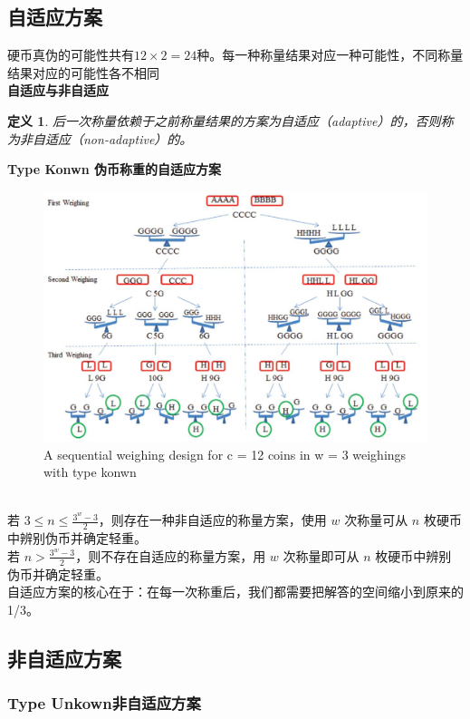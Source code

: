 \documentclass[10t, a4paper, oneside]{ctexbook}
\newtheorem{definition}[theorem]{定义}
\begin{document}
\subsection{自适应方案}
硬币真伪的可能性共有$12\times2 = 24$种。每一种称量结果对应一种可能性，不同称量结果对应的可能性各不相同\\
\textbf{自适应与非自适应}
\begin{definition}
后一次称量依赖于之前称量结果的方案为自适应（adaptive）的，否则称为非自适应（non-adaptive）的。\\
\end{definition}
\textbf{Type Konwn 伪币称重的自适应方案}
\begin{figure}[H]
    \centering
    \includegraphics[width = 15cm]{assets/sequential_weighing_design.png}
    \caption{A sequential weighing design for c = 12 coins in w = 3 weighings with type konwn}
\end{figure}
\\
若 $3\leq n\leq \frac{3^w-3}{2}$，则存在一种非自适应的称量方案，使用 $w$ 次称量可从 $n$ 枚硬币中辨别伪币并确定轻重。\\
若 $n>\frac{3^w-3}{2}$，则不存在自适应的称量方案，用 $w$ 次称量即可从 $n$ 枚硬币中辨别伪币并确定轻重。\\
自适应方案的核心在于：在每一次称重后，我们都需要把解答的空间缩小到原来的 1/3。
\subsection{非自适应方案}
\subsubsection{Type Unkown非自适应方案}
\end{document}
